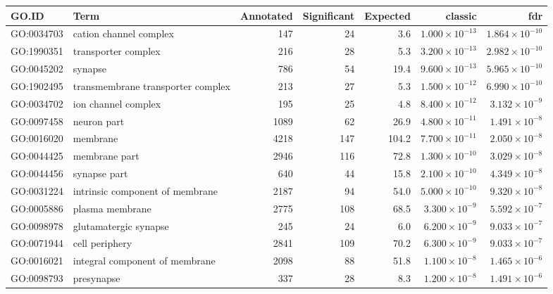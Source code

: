\begin{table}[ht]
\centering
\begin{adjustbox}{width=\textwidth}
\begin{tabular}{llrrrrr}
  \hline
GO.ID & Term & Annotated & Significant & Expected & classic & fdr \\ 
  \hline
GO:0034703 & cation channel complex & 147 & 24 & 3.6 & $1.000 \times 10^{-13}$ & $1.864 \times 10^{-10}$ \\ 
  GO:1990351 & transporter complex & 216 & 28 & 5.3 & $3.200 \times 10^{-13}$ & $2.982 \times 10^{-10}$ \\ 
  GO:0045202 & synapse & 786 & 54 & 19.4 & $9.600 \times 10^{-13}$ & $5.965 \times 10^{-10}$ \\ 
  GO:1902495 & transmembrane transporter complex & 213 & 27 & 5.3 & $1.500 \times 10^{-12}$ & $6.990 \times 10^{-10}$ \\ 
  GO:0034702 & ion channel complex & 195 & 25 & 4.8 & $8.400 \times 10^{-12}$ & $3.132 \times 10^{-9}$ \\ 
  GO:0097458 & neuron part & 1089 & 62 & 26.9 & $4.800 \times 10^{-11}$ & $1.491 \times 10^{-8}$ \\ 
  GO:0016020 & membrane & 4218 & 147 & 104.2 & $7.700 \times 10^{-11}$ & $2.050 \times 10^{-8}$ \\ 
  GO:0044425 & membrane part & 2946 & 116 & 72.8 & $1.300 \times 10^{-10}$ & $3.029 \times 10^{-8}$ \\ 
  GO:0044456 & synapse part & 640 & 44 & 15.8 & $2.100 \times 10^{-10}$ & $4.349 \times 10^{-8}$ \\ 
  GO:0031224 & intrinsic component of membrane & 2187 & 94 & 54.0 & $5.000 \times 10^{-10}$ & $9.320 \times 10^{-8}$ \\ 
  GO:0005886 & plasma membrane & 2775 & 108 & 68.5 & $3.300 \times 10^{-9}$ & $5.592 \times 10^{-7}$ \\ 
  GO:0098978 & glutamatergic synapse & 245 & 24 & 6.0 & $6.200 \times 10^{-9}$ & $9.033 \times 10^{-7}$ \\ 
  GO:0071944 & cell periphery & 2841 & 109 & 70.2 & $6.300 \times 10^{-9}$ & $9.033 \times 10^{-7}$ \\ 
  GO:0016021 & integral component of membrane & 2098 & 88 & 51.8 & $1.100 \times 10^{-8}$ & $1.465 \times 10^{-6}$ \\ 
  GO:0098793 & presynapse & 337 & 28 & 8.3 & $1.200 \times 10^{-8}$ & $1.491 \times 10^{-6}$ \\ 

\end{tabular}
\end{adjustbox}
\end{table}
